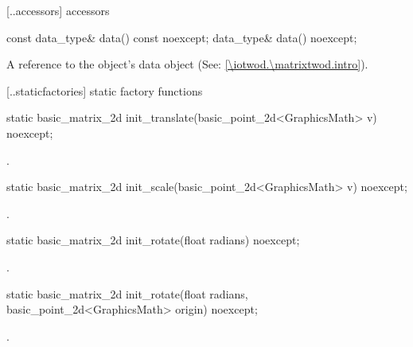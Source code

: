  [\iotwod.\matrixtwod.accessors] { accessors}

%
\begin{itemdecl}
const data_type& data() const noexcept;
data_type& data() noexcept;
\end{itemdecl}
\begin{itemdescr}
\pnum
\returns
A reference to the  object's data object (See: \ref{\iotwod.\matrixtwod.intro}).
\end{itemdescr}

 [\iotwod.\matrixtwod.staticfactories] { static factory 
functions}

%
\begin{itemdecl}
static basic_matrix_2d init_translate(basic_point_2d<GraphicsMath> v) noexcept;
\end{itemdecl}
\begin{itemdescr}
\pnum
\returns
{}.
\end{itemdescr}

%
\begin{itemdecl}
static basic_matrix_2d init_scale(basic_point_2d<GraphicsMath> v) noexcept;
\end{itemdecl}
\begin{itemdescr}
\pnum
\returns
{}.
\end{itemdescr}

%
\begin{itemdecl}
static basic_matrix_2d init_rotate(float radians) noexcept;
\end{itemdecl}
\begin{itemdescr}
\pnum
\returns
{}.
\end{itemdescr}

%
\begin{itemdecl}
static basic_matrix_2d init_rotate(float radians, basic_point_2d<GraphicsMath> origin) noexcept;
\end{itemdecl}
\begin{itemdescr}
\pnum
\returns
{}.
\end{itemdescr}


